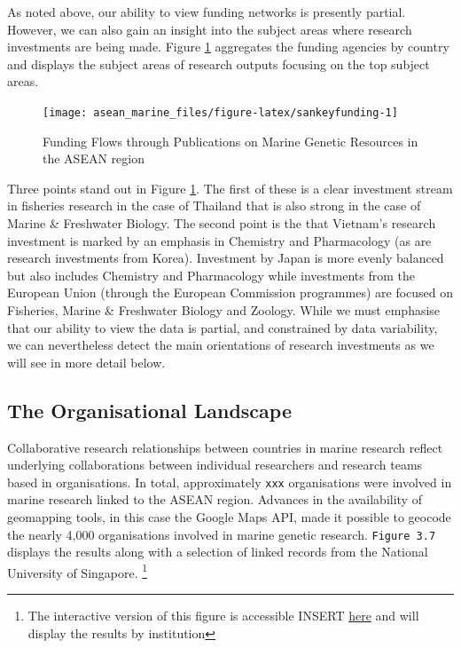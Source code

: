 \documentclass[]{book}
\theoremstyle{definition}
\theoremstyle{definition}
\theoremstyle{definition}
\theoremstyle{remark}
\begin{document}
As noted above, our ability to view funding networks is presently
partial. However, we can also gain an insight into the subject areas
where research investments are being made. Figure
\ref{fig:sankeyfunding} aggregates the funding agencies by country and
displays the subject areas of research outputs focusing on the top
subject areas.

\begin{figure}

{\centering \texttt{[image: asean\_marine\_files/figure-latex/sankeyfunding-1]} 

}

\caption{Funding Flows through Publications on Marine Genetic Resources in the ASEAN region}\label{fig:sankeyfunding}
\end{figure}

Three points stand out in Figure \ref{fig:sankeyfunding}. The first of
these is a clear investment stream in fisheries research in the case of
Thailand that is also strong in the case of Marine \& Freshwater
Biology. The second point is the that Vietnam's research investment is
marked by an emphasis in Chemistry and Pharmacology (as are research
investments from Korea). Investment by Japan is more evenly balanced but
also includes Chemistry and Pharmacology while investments from the
European Union (through the European Commission programmes) are focused
on Fisheries, Marine \& Freshwater Biology and Zoology. While we must
emphasise that our ability to view the data is partial, and constrained
by data variability, we can nevertheless detect the main orientations of
research investments as we will see in more detail below.

\hypertarget{the-organisational-landscape}{%
\subsection{The Organisational
Landscape}\label{the-organisational-landscape}}

Collaborative research relationships between countries in marine
research reflect underlying collaborations between individual
researchers and research teams based in organisations. In total,
approximately \texttt{xxx} organisations were involved in marine
research linked to the ASEAN region. Advances in the availability of
geomapping tools, in this case the Google Maps API, made it possible to
geocode the nearly 4,000 organisations involved in marine genetic
research. \texttt{Figure\ 3.7} displays the results along with a
selection of linked records from the National University of Singapore.
\footnote{The interactive version of this figure is accessible INSERT
  \href{}{here} and will display the results by institution}
\end{document}
